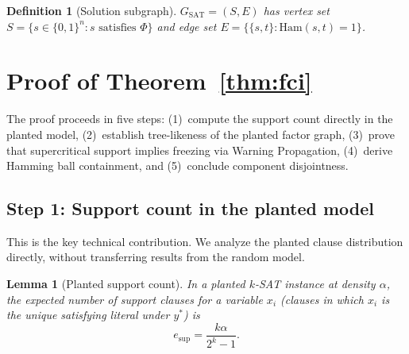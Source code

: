 \documentclass[11pt]{article}
\newtheorem{lemma}[theorem]{Lemma}
\newtheorem{definition}[theorem]{Definition}
\begin{document}
\begin{definition}[Solution subgraph]\label{def:gsat}
$G_{\mathrm{SAT}} = (S, E)$ has vertex set $S = \{s \in \{0,1\}^n : s \text{ satisfies } \Phi\}$ and edge set $E = \{\{s,t\} : \mathrm{Ham}(s,t) = 1\}$.
\end{definition}


\section{Proof of Theorem~\ref{thm:fci}}

The proof proceeds in five steps: (1)~compute the support count directly in the planted model, (2)~establish tree-likeness of the planted factor graph, (3)~prove that supercritical support implies freezing via Warning Propagation, (4)~derive Hamming ball containment, and (5)~conclude component disjointness.

\subsection{Step 1: Support count in the planted model}

This is the key technical contribution.  We analyze the planted clause distribution directly, without transferring results from the random model.

\begin{lemma}[Planted support count]\label{lem:support}
In a planted $k$-SAT instance at density $\alpha$, the expected number of support clauses for a variable $x_i$ (clauses in which $x_i$ is the unique satisfying literal under $y^*$) is
\[
e_{\mathrm{sup}} = \frac{k\alpha}{2^k - 1}.
\]
\end{lemma}
\end{document}
